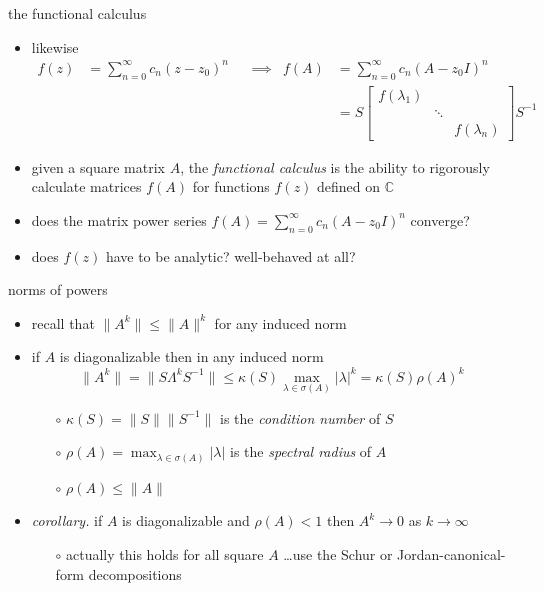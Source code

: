 \documentclass[10pt,hyperref]{beamer}
\newcommand{\CC}{\mathbb{C}}
\begin{document}
\begin{frame}{the functional calculus}

\begin{itemize}
\item likewise
\small
\begin{align*}
f(z) &= \sum_{n=0}^\infty c_n (z-z_0)^n & &\implies & f(A) &= \sum_{n=0}^\infty c_n (A-z_0 I)^n \\
     &&&& &= S \begin{bmatrix} f(\lambda_1) & & \\ & \ddots & \\ & & f(\lambda_n) \end{bmatrix} S^{-1}
\end{align*}
\normalsize
\item given a square matrix $A$, the \emph{functional calculus} is the ability to rigorously calculate matrices $f(A)$ for functions $f(z)$ defined on $\CC$
\item does the matrix power series $f(A) = \sum_{n=0}^\infty c_n (A-z_0 I)^n$ converge?
\item does $f(z)$ have to be analytic? well-behaved at all?
\end{itemize}
\end{frame}


\begin{frame}{norms of powers}

\begin{itemize}
\item recall that $\|A^k\| \le \|A\|^k$ for any induced norm
\item if $A$ is diagonalizable then in any induced norm
    $$\|A^k\| = \|S\Lambda^k S^{-1}\| \le \kappa(S) \max_{\lambda\in\sigma(A)} |\lambda|^k = \kappa(S) \rho(A)^k$$

\vspace{-3mm}
    \begin{itemize}
    \item[$\circ$] $\kappa(S)=\|S\|\|S^{-1}\|$ is the \emph{condition number} of $S$
    \item[$\circ$] $\rho(A)=\max_{\lambda\in\sigma(A)} |\lambda|$ is the \emph{spectral radius} of $A$
    \item[$\circ$] $\rho(A)\le \|A\|$
    \end{itemize}
\item \emph{corollary.} if $A$ is diagonalizable and $\rho(A)<1$ then $A^k \to 0$ as $k\to\infty$
    \begin{itemize}
    \item[$\circ$] actually this holds for all square $A$ \dots use the Schur or Jordan-canonical-form decompositions
    \end{itemize}
\end{itemize}
\end{frame}
\end{document}
